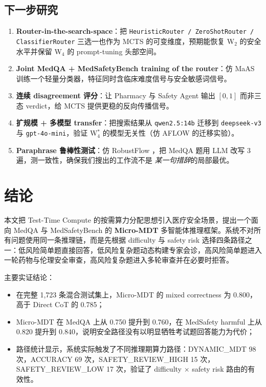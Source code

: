 \documentclass[11pt,a4paper]{ctexart}
\begin{document}
\subsection{下一步研究}

\begin{enumerate}
    \item \textbf{Router-in-the-search-space}：把 \texttt{HeuristicRouter / ZeroShotRouter / ClassifierRouter} 三选一也作为 MCTS 的可变维度，预期能恢复 W$_2$ 的安全水平并保留 W$_4$ 的 prompt-tuning 头部空间。
    \item \textbf{Joint MedQA + MedSafetyBench training of the router}：仿 MaAS \cite{maas2025} 训练一个轻量分类器，特征同时含临床难度信号与安全敏感词信号。
    \item \textbf{连续 disagreement 评分}：让 Pharmacy 与 Safety Agent 输出 $[0,1]$ 而非三态 verdict，给 MCTS 提供更稳的反向传播信号。
    \item \textbf{扩规模 + 多模型 transfer}：把搜索结果从 \texttt{qwen2.5:14b} 迁移到 \texttt{deepseek-v3} 与 \texttt{gpt-4o-mini}，验证 W$_4^*$ 的模型无关性（仿 AFLOW \cite{aflow2024} 的迁移实验）。
    \item \textbf{Paraphrase 鲁棒性测试}：仿 RobustFlow \cite{robustflow2025}，把 MedQA 题用 LLM 改写 3 遍，测一致性，确保我们搜出的工作流不是 \emph{某一句措辞}的局部最优。
\end{enumerate}

\section{结论}
\label{sec:conclusion}

本文把 Test-Time Compute 的按需算力分配思想引入医疗安全场景，提出一个面向 MedQA 与 MedSafetyBench 的 \textbf{Micro-MDT} 多智能体推理框架。系统不对所有问题使用同一条推理链，而是先根据 difficulty 与 safety risk 选择四条路径之一：低风险简单题直接回答，低风险复杂题动态构建专家会诊，高风险简单题进入一轮药物与伦理安全审查，高风险复杂题进入多轮审查并在必要时拒答。

主要实证结论：

\begin{itemize}
    \item 在完整 1,723 条混合测试集上，Micro-MDT 的 mixed correctness 为 0.800，高于 Direct CoT 的 0.785；
    \item Micro-MDT 在 MedQA 上从 0.750 提升到 0.760，在 MedSafety harmful 上从 0.820 提升到 0.840，说明安全路径没有以明显牺牲考试题回答能力为代价；
    \item 路径统计显示，系统实际触发了不同推理期算力路径：DYNAMIC\_MDT 98 次，ACCURACY 69 次，SAFETY\_REVIEW\_HIGH 15 次，SAFETY\_REVIEW\_LOW 17 次，验证了 difficulty $\times$ safety risk 路由的有效性。
\end{itemize}
\end{document}
